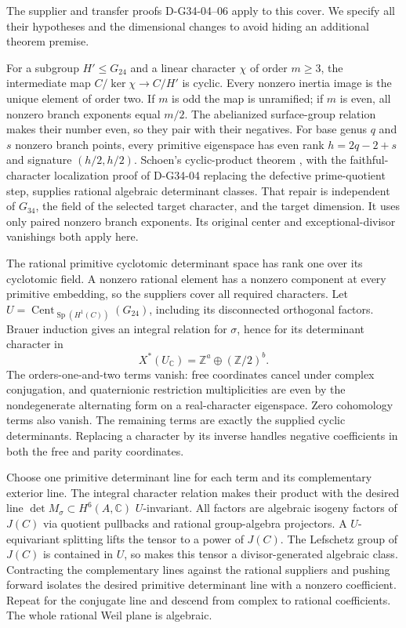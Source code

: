 The supplier and transfer proofs D-G34-04--06 apply to this cover.  We
specify all their hypotheses and the dimensional changes to avoid hiding
an additional theorem premise.

For a subgroup \(H'\le G_{24}\) and a linear character \(\chi\) of order
\(m\ge3\), the intermediate map
\(C/\ker\chi\to C/H'\) is cyclic.  Every nonzero inertia image is the
unique element of order two.  If \(m\) is odd the map is unramified; if
\(m\) is even, all nonzero branch exponents equal \(m/2\).  The abelianized
surface-group relation makes their number even, so they pair with their
negatives.  For base genus \(q\) and \(s\) nonzero branch points, every
primitive eigenspace has even rank \(h=2q-2+s\) and signature
\((h/2,h/2)\).  Schoen's cyclic-product theorem
\cite[Theorem 2.0 and Corollary 3.1]{G34:Schoen}, with the faithful-character
localization proof of D-G34-04 replacing the defective prime-quotient step,
supplies rational algebraic determinant classes.  That repair is independent
of \(G_{34}\), the field of the selected target character, and the target
dimension.  It uses only paired nonzero branch exponents.  Its original
center and exceptional-divisor vanishings both apply here.

The rational primitive cyclotomic determinant space has rank one over its
cyclotomic field.  A nonzero rational element has a nonzero component at
every primitive embedding, so the suppliers cover all required characters.
Let \(U=\operatorname{Cent}_{\operatorname{Sp}(H^1(C))}(G_{24})\), including
its disconnected orthogonal factors.  Brauer induction gives an integral
relation for \(\sigma\), hence for its determinant character in
\[
                       X^*(U_{\mathbb C})=\mathbb Z^a\oplus(\mathbb Z/2)^b.
\]
The orders-one-and-two terms vanish: free coordinates cancel under complex
conjugation, and quaternionic restriction multiplicities are even by the
nondegenerate alternating form on a real-character eigenspace.  Zero
cohomology terms also vanish.  The remaining terms are exactly the supplied
cyclic determinants.  Replacing a character by its inverse handles negative
coefficients in both the free and parity coordinates.

Choose one primitive determinant line for each term and its complementary
exterior line.  The integral character relation makes their product with
the desired line \(\det M_\sigma\subset H^6(A,\mathbb C)\) \(U\)-invariant.
All factors are algebraic isogeny factors of \(J(C)\) via quotient pullbacks
and rational group-algebra projectors.  A \(U\)-equivariant splitting lifts
the tensor to a power of \(J(C)\).  The Lefschetz group of \(J(C)\) is
contained in \(U\), so \cite[Theorem 3.2]{G34:Milne} makes this tensor a
divisor-generated algebraic class.  Contracting the complementary lines
against the rational suppliers and pushing forward isolates the desired
primitive determinant line with a nonzero coefficient.  Repeat for the
conjugate line and descend from complex to rational coefficients.  The
whole rational Weil plane is algebraic.

